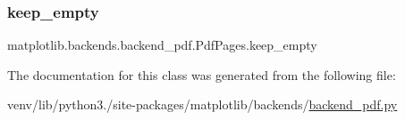\subsubsection{\texorpdfstring{keep\+\_\+empty}{keep\_empty}}
{\footnotesize\ttfamily matplotlib.\+backends.\+backend\+\_\+pdf.\+Pdf\+Pages.\+keep\+\_\+empty}



The documentation for this class was generated from the following file\+:\begin{DoxyCompactItemize}
\item 
venv/lib/python3./site-\/packages/matplotlib/backends/\hyperlink{backend__pdf_8py}{backend\+\_\+pdf.\+py}\end{DoxyCompactItemize}
